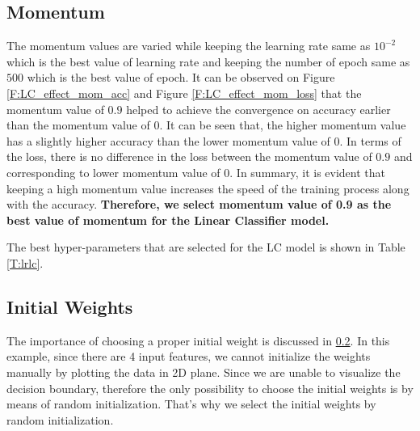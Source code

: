 \documentclass[12pt, a4paper, twoside]{article}
\begin{document}
\subsection{Momentum}\label{SS:lc-mom}
The momentum values are varied while keeping the learning rate same as $10^{-2}$ which is the best value of learning rate and keeping the number of epoch same as $500$ which is the best value of epoch. It can be observed on Figure \ref{F:LC_effect_mom_acc} and Figure \ref{F:LC_effect_mom_loss} that the momentum value of $0.9$ helped to achieve the convergence on accuracy earlier than the momentum value of 0. It can be seen that, the higher momentum value has a slightly higher accuracy than the lower momentum value of 0. In terms of the loss, there is no difference in the loss between the momentum value of $0.9$ and corresponding to lower momentum value of 0. In summary, it is evident that keeping a high momentum value increases the speed of the training process along with the accuracy. \textbf{Therefore, we select momentum value of 0.9 as the best value of momentum for the Linear Classifier model.}
\par
The best hyper-parameters that are selected for the LC model is shown in Table \ref{T:lrlc}.
\subsection{Initial Weights}\label{SS:lc-w0}
The importance of choosing a proper initial weight is discussed in \ref{SS:lc-w0}. In this example, since there are 4 input features, we cannot initialize the weights manually by plotting the data in 2D plane. Since we are unable to visualize the decision boundary, therefore the only possibility to choose the initial weights is by means of random initialization. That's why we select the initial weights by random initialization.
\end{document}
